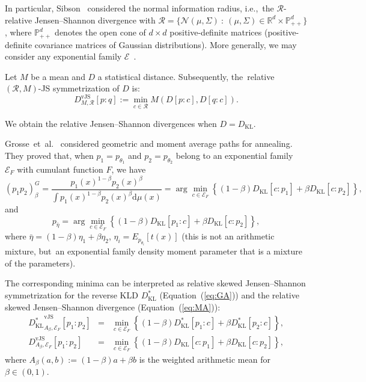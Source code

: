 \documentclass[entropy,article,accept,oneauthor,pdftex,entropy]{Definitions/mdpi}
\def\bbR{\mathbb{R}}
\def\vJS{\mathrm{vJS}}
\def\KL{\mathrm{KL}}
\def\dmu{\mathrm{d}\mu}
\def\calE{\mathcal{E}}
\def\calN{\mathcal{N}}
\def\calR{\mathcal{R}}
\def\dmu{\mathrm{d}\mu}
\def\bbP{\mathbb{P}}
\begin{document}
\begin{paracol}{2}
In particular, Sibson~\cite{Sibson-1969} considered the normal information radius, i.e.,~the  
 $\calR$-relative Jensen--Shannon divergence
with $\calR=\{\calN(\mu,\Sigma)\ :\ (\mu,\Sigma)\in \bbR^d\times\bbP_{++}^d\}$, 
where $\bbP_{++}^d$ denotes the open cone of $d\times d$ positive-definite matrices (positive-definite covariance matrices of Gaussian distributions).
More generally, we may consider any exponential family $\calE$~\cite{EF-2014}.



\begin{Definition}[Relative $(\calR,M)$-JS symmetrization of $D$]\label{def:relJSsym}
Let $M$ be a mean and $D$ a statistical distance. Subsequently, the~relative $(\calR,M)$-JS symmetrization of $D$ is:
$$
D^\vJS_{M,\calR}[p:q] := \min_{c\in\calR} M\left(D[p:c], D[q:c]\right).
$$
\end{Definition}

We obtain the relative Jensen--Shannon divergences when $D=D_\KL$.

\begin{Example}
Grosse~et~al.~\cite{Grosse-2013} considered geometric and moment average paths for annealing.
They proved that, when $p_1=p_{\theta_1}$ and $p_2=p_{\theta_2}$ belong to an exponential family~\cite{EF-2014} $\calE_F$ with
cumulant function $F$, we have
\begin{equation}\label{eq:GA}
(p_1p_2)_\beta^G = \frac{p_1(x)^{1-\beta}p_2(x)^\beta}{\int p_1(x)^{1-\beta}p_2(x)^\beta\dmu(x)} 
= \arg\min_{c\in \calE_F} \left\{(1-\beta)D_\KL[c:p_1]+\beta D_\KL[c:p_2]\right\},
\end{equation}
and
\begin{equation}\label{eq:MA}
p_{\bar\eta}=\arg\min_{c\in \calE_F} \left\{(1-\beta)D_\KL[p_1:c]+\beta D_\KL[c:p_2]\right\},
\end{equation}
where $\bar\eta=(1-\beta)\eta_1+\beta\eta_2$, $\eta_i=E_{p_{\theta_i}}[t(x)]$ (this is not an arithmetic mixture, but~an exponential family density moment parameter that is a mixture
of the parameters). 

The corresponding minima can be interpreted as relative skewed Jensen--Shannon symmetrization for the reverse KLD $D_\KL^*$ (Equation~(\ref{eq:GA})) and the relative skewed Jensen--Shannon divergence (Equation~(\ref{eq:MA})):
\begin{eqnarray}
{D_\KL^*}^\vJS_{A_\beta,\calE_F}[p_1:p_2] &=&  \min_{c\in \calE_F} \left\{(1-\beta)D_\KL^*[p_1:c]+\beta D_\KL^*[p_2:c]\right\},\\
D^\vJS_{A_\beta,\calE_F}[p_1:p_2] &=& \min_{c\in \calE_F} \left\{(1-\beta)D_\KL[c:p_1]+\beta D_\KL[c:p_2]\right\},
\end{eqnarray}
where $A_\beta(a,b):=(1-\beta)a+\beta b$ is the weighted arithmetic mean for $\beta\in(0,1)$.
\end{Example}


\end{paracol}
\end{document}
